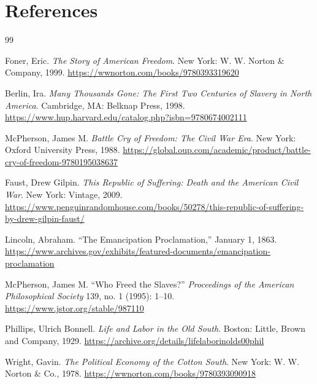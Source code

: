 \documentclass[12pt]{article}
\begin{document}
\section*{References}
\begin{thebibliography}{99}

Foner, Eric. 
\textit{The Story of American Freedom}. 
New York: W. W. Norton \& Company, 1999.  
\href{https://wwnorton.com/books/9780393319620}{https://wwnorton.com/books/9780393319620}

Berlin, Ira. 
\textit{Many Thousands Gone: The First Two Centuries of Slavery in North America}. 
Cambridge, MA: Belknap Press, 1998.  
\href{https://www.hup.harvard.edu/catalog.php?isbn=9780674002111}{https://www.hup.harvard.edu/catalog.php?isbn=9780674002111}

McPherson, James M. 
\textit{Battle Cry of Freedom: The Civil War Era}. 
New York: Oxford University Press, 1988.  
\href{https://global.oup.com/academic/product/battle-cry-of-freedom-9780195038637}{https://global.oup.com/academic/product/battle-cry-of-freedom-9780195038637}

Faust, Drew Gilpin. 
\textit{This Republic of Suffering: Death and the American Civil War}.
New York: Vintage, 2009.  
\href{https://www.penguinrandomhouse.com/books/50278/this-republic-of-suffering-by-drew-gilpin-faust/}{https://www.penguinrandomhouse.com/books/50278/this-republic-of-suffering-by-drew-gilpin-faust/}

Lincoln, Abraham. 
``The Emancipation Proclamation,'' January 1, 1863.  
\href{https://www.archives.gov/exhibits/featured-documents/emancipation-proclamation}{https://www.archives.gov/exhibits/featured-documents/emancipation-proclamation}

McPherson, James M. 
``Who Freed the Slaves?'' 
\textit{Proceedings of the American Philosophical Society} 139, no. 1 (1995): 1–10.  
\href{https://www.jstor.org/stable/987110}{https://www.jstor.org/stable/987110}

Phillips, Ulrich Bonnell. 
\textit{Life and Labor in the Old South}. 
Boston: Little, Brown and Company, 1929.  
\href{https://archive.org/details/lifelaborinolds00phil}{https://archive.org/details/lifelaborinolds00phil}

Wright, Gavin. 
\textit{The Political Economy of the Cotton South}. 
New York: W. W. Norton \& Co., 1978.  
\href{https://wwnorton.com/books/9780393090918}{https://wwnorton.com/books/9780393090918}


\end{thebibliography}
\end{document}
